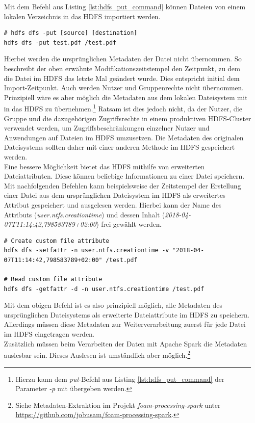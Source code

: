 \noindent
Mit dem Befehl aus Listing \ref{lst:hdfs_put_command} können Dateien von einem lokalen Verzeichnis in das HDFS importiert werden. 
\begin{lstlisting}[label={lst:hdfs_put_command},caption= Befehl zum Speichern einer Datei im HDFS,captionpos=b,frame=single,style=customshell]
# hdfs dfs -put [source] [destination]
hdfs dfs -put test.pdf /test.pdf
\end{lstlisting}

\noindent
Hierbei werden die ursprünglichen Metadaten der Datei nicht übernommen. So beschreibt der oben erwähnte Modifikationszeitstempel den Zeitpunkt, zu dem die Datei im HDFS das letzte Mal geändert wurde. Dies entspricht initial dem Import-Zeitpunkt. Auch werden Nutzer und Gruppenrechte nicht übernommen. Prinzipiell wäre es aber möglich die Metadaten aus dem lokalen Dateisystem mit in das HDFS zu übernehmen.\footnote{Hierzu kann dem \textit{put}-Befehl aus Listing \ref{lst:hdfs_put_command} der Parameter \textit{-p} mit übergeben werden.} Ratsam ist dies jedoch nicht, da der Nutzer, die Gruppe und die dazugehörigen Zugriffsrechte in einem produktiven HDFS-Cluster verwendet werden, um Zugriffsbeschränkungen einzelner Nutzer und Anwendungen auf Dateien im HDFS umzusetzen. Die Metadaten des originalen Dateisystems sollten daher mit einer anderen Methode im HDFS gespeichert werden.\\

\noindent
Eine bessere Möglichkeit bietet das HDFS mithilfe von erweiterten Dateiattributen. Diese können beliebige Informationen zu einer Datei speichern. Mit nachfolgenden Befehlen kann beispielsweise der Zeitstempel der Erstellung einer Datei aus dem ursprünglichen Dateisystem im HDFS als erweitertes Attribut gespeichert und ausgelesen werden. Hierbei kann der Name des Attributs (\textit{user.ntfs.creationtime}) und dessen Inhalt (\textit{2018-04-07T11:14:42,798583789+02:00}) frei gewählt werden.
\begin{lstlisting}[label={lst:hdfs_fattr_command},caption= Befehl zum Hinzufügen und Auslesen von Metadaten,captionpos=b,frame=single,style=customshell]
# Create custom file attribute
hdfs dfs -setfattr -n user.ntfs.creationtime -v "2018-04-07T11:14:42,798583789+02:00" /test.pdf

# Read custom file attribute
hdfs dfs -getfattr -d -n user.ntfs.creationtime /test.pdf
\end{lstlisting}

\noindent
Mit dem obigen Befehl ist es also prinzipiell möglich, alle Metadaten des ursprünglichen Dateisystems als erweiterte Dateiattribute im HDFS zu speichern. Allerdings müssen diese Metadaten zur Weiterverarbeitung zuerst für jede Datei im HDFS eingetragen werden.\\
Zusätzlich müssen beim Verarbeiten der Daten mit Apache Spark die Metadaten auslesbar sein. Dieses Auslesen ist umständlich aber möglich.\footnote{Siehe Metadaten-Extraktion im Projekt \textit{foam-processing-spark} unter \url{https://github.com/jobusam/foam-processing-spark}.}\\

